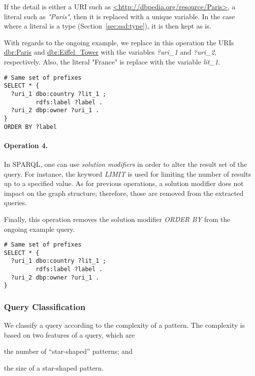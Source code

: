 If the detail is either a URI such as \href{http://dbpedia.org/resource/Paris}{<http://dbpedia.org/resource/Paris>}, a literal such as \emph{"Paris"}, then it is replaced with a unique variable. In the case where a literal is a type (Section~\ref{sec:ssd:type}), it is then kept as is.

With regards to the ongoing example, we replace in this operation the URIs \href{http://dbpedia.org/resource/Paris}{dbr:Paris} and \href{http://dbpedia.org/resource/Eiffel\_Tower}{dbr:Eiffel\_Tower} with the variables \emph{?uri\_1} and \emph{?uri\_2}, respectively. Also, the literal "France" is replace with the variable \emph{lit\_1}.
\begin{verbatim}
# Same set of prefixes
SELECT * {
  ?uri_1 dbo:country ?lit_1 ;
         rdfs:label ?label .
  ?uri_2 dbp:owner ?uri_1 .
}
ORDER BY ?label
\end{verbatim}

\paragraph{Operation 4.}

In SPARQL, one can use \emph{solution modifiers} in order to alter the result set of the query. For instance, the keyword \emph{LIMIT} is used for limiting the number of results up to a specified value. As for previous operations, a solution modifier does not impact on the graph structure; therefore, those are removed from the extracted queries.

Finally, this operation removes the solution modifier \emph{ORDER BY} from the ongoing example query.
\begin{verbatim}
# Same set of prefixes
SELECT * {
  ?uri_1 dbo:country ?lit_1 ;
         rdfs:label ?label .
  ?uri_2 dbp:owner ?uri_1 .
}
\end{verbatim}

\subsubsection{Query Classification}

We classify a query according to the complexity of a pattern. The complexity is based on two features of a query, which are
\begin{inparaenum}[(i)]
	\item the number of ``star-shaped'' patterns; and
	\item the size of a star-shaped pattern.
\end{inparaenum}

